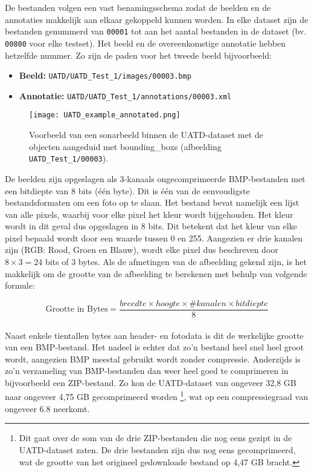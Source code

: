 De bestanden volgen een vast benamingsschema zodat de beelden en de annotaties makkelijk aan elkaar gekoppeld kunnen worden. In elke dataset zijn de bestanden genummerd van \texttt{00001} tot aan het aantal bestanden in de dataset (bv. \texttt{00800} voor elke testset). Het beeld en de overeenkomstige annotatie hebben hetzelfde nummer. Zo zijn de paden voor het tweede beeld bijvoorbeeld:

\begin{itemize}
    \item \textbf{Beeld:} \texttt{UATD/UATD\_Test\_1/images/00003.bmp}
    \item \textbf{Annotatie:} \texttt{UATD/UATD\_Test\_1/annotations/00003.xml}
\end{itemize}

\begin{figure}[H]
    \centering
    \texttt{[image: UATD\_example\_annotated.png]}
    \caption[UATD afbeelding met bounding boxes.]{\label{fig:uatd_image}Voorbeeld van een sonarbeeld binnen de UATD-dataset met de objecten aangeduid met \glspl{bounding_box} (afbeelding \texttt{UATD\_Test\_1/00003}). \autocite{Xie_2022}}
\end{figure}

De beelden zijn opgeslagen als 3-kanaals ongecomprimeerde BMP-bestanden met een bitdiepte van 8 bits (één byte). Dit is één van de eenvoudigste bestandsformaten om een foto op te slaan. Het bestand bevat namelijk een lijst van alle pixels, waarbij voor elke pixel het kleur wordt bijgehouden. Het kleur wordt in dit geval dus opgeslagen in 8 bits. Dit betekent dat het kleur van elke pixel bepaald wordt door een waarde tussen 0 en 255. Aangezien er drie kanalen zijn (RGB: Rood, Groen en Blauw), wordt elke pixel dus beschreven door $8 \times 3 = 24$ bits of 3 bytes. Als de afmetingen van de afbeelding gekend zijn, is het makkelijk om de grootte van de afbeelding te berekenen met behulp van volgende formule:

$$
\text{Grootte in Bytes} = \frac{breedte \times hoogte \times \#kanalen \times bitdiepte}{8}
$$ \\

Naast enkele tientallen bytes aan header- en fotodata is dit de werkelijke grootte van een BMP-bestand. Het nadeel is echter dat zo'n bestand heel snel heel groot wordt, aangezien BMP meestal gebruikt wordt zonder compressie. Anderzijds is zo'n verzameling van BMP-bestanden dan weer heel goed te comprimeren in bijvoorbeeld een ZIP-bestand. Zo kon de UATD-dataset van ongeveer 32,8 GB naar ongeveer 4,75 GB gecomprimeerd worden \footnote{Dit gaat over de som van de drie ZIP-bestanden die nog eens gezipt in de UATD-dataset zaten. De drie bestanden zijn dus nog eens gecomprimeerd, wat de grootte van het origineel gedownloade bestand op 4,47 GB bracht.}, wat op een compressiegraad van ongeveer 6.8 neerkomt. \autocite{Bourke_1998}

